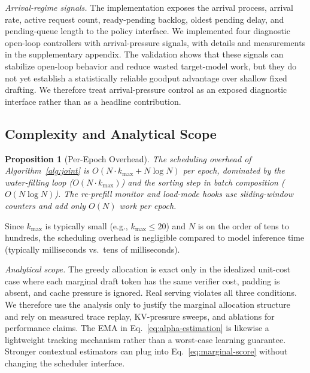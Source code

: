 \documentclass[journal]{IEEEtran}
\newtheorem{proposition}{Proposition}
\begin{document}
\textit{Arrival-regime signals.}
The implementation exposes the arrival process, arrival rate, active
request count, ready-pending backlog, oldest pending delay, and
pending-queue length to the policy interface. We implemented four
diagnostic open-loop controllers with arrival-pressure signals, with
details and measurements in the supplementary appendix. The validation shows
that these signals can stabilize open-loop behavior and reduce wasted
target-model work, but they do not yet establish a statistically
reliable goodput advantage over shallow fixed drafting. We therefore
treat arrival-pressure control as an exposed diagnostic interface rather
than as a headline contribution.

\subsection{Complexity and Analytical Scope}
\label{sec:alg-complexity}

\begin{proposition}[Per-Epoch Overhead]
\label{prop:complexity}
The scheduling overhead of Algorithm~\ref{alg:joint} 
is $O(N \cdot k_{\max} + N \log N)$ per epoch, 
dominated by the water-filling loop 
($O(N \cdot k_{\max})$) and the sorting step in 
batch composition ($O(N \log N)$). The re-prefill monitor 
and load-mode hooks use sliding-window counters and add only 
$O(N)$ work per epoch.
\end{proposition}

Since $k_{\max}$ is typically small (e.g., 
$k_{\max} \leq 20$) and $N$ is on the order of 
tens to hundreds, the scheduling overhead is 
negligible compared to model inference time 
(typically milliseconds vs.\ tens of milliseconds).

\textit{Analytical scope.}
The greedy allocation is exact only in the idealized unit-cost case
where each marginal draft token has the same verifier cost, padding is
absent, and cache pressure is ignored. Real serving violates all three
conditions. We therefore use the analysis only to justify the marginal
allocation structure and rely on measured trace replay, KV-pressure
sweeps, and ablations for performance claims. The EMA in
Eq.~\eqref{eq:alpha-estimation} is likewise a lightweight tracking
mechanism rather than a worst-case learning guarantee. Stronger
contextual estimators can plug into Eq.~\eqref{eq:marginal-score}
without changing the scheduler interface.


\end{document}
